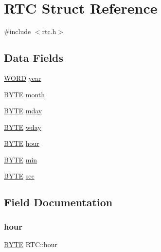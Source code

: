 \hypertarget{struct_r_t_c}{}\section{R\+TC Struct Reference}
\label{struct_r_t_c}


{\ttfamily \#include $<$rtc.\+h$>$}

\subsection*{Data Fields}
\begin{DoxyCompactItemize}
\item 
\mbox{\hyperlink{integer_8h_a197942eefa7db30960ae396d68339b97}{W\+O\+RD}} \mbox{\hyperlink{struct_r_t_c_acb5071073b17bef18e2e0c0cf10900e1}{year}}
\item 
\mbox{\hyperlink{lz4_8c_a4ae1dab0fb4b072a66584546209e7d58}{B\+Y\+TE}} \mbox{\hyperlink{struct_r_t_c_ac2bd3ef00f0fa3600b729702d3a4df96}{month}}
\item 
\mbox{\hyperlink{lz4_8c_a4ae1dab0fb4b072a66584546209e7d58}{B\+Y\+TE}} \mbox{\hyperlink{struct_r_t_c_acc4fbd65d30d36768b338a734a1f90a7}{mday}}
\item 
\mbox{\hyperlink{lz4_8c_a4ae1dab0fb4b072a66584546209e7d58}{B\+Y\+TE}} \mbox{\hyperlink{struct_r_t_c_ae5f840070c223cdc4c1d5279934bae1a}{wday}}
\item 
\mbox{\hyperlink{lz4_8c_a4ae1dab0fb4b072a66584546209e7d58}{B\+Y\+TE}} \mbox{\hyperlink{struct_r_t_c_a8116dd5108afa42843c41510b68dcab6}{hour}}
\item 
\mbox{\hyperlink{lz4_8c_a4ae1dab0fb4b072a66584546209e7d58}{B\+Y\+TE}} \mbox{\hyperlink{struct_r_t_c_a6a57a49351a0cdb606bb74d2930496ec}{min}}
\item 
\mbox{\hyperlink{lz4_8c_a4ae1dab0fb4b072a66584546209e7d58}{B\+Y\+TE}} \mbox{\hyperlink{struct_r_t_c_a4e9dca93b2215d13696ea8c92755c05a}{sec}}
\end{DoxyCompactItemize}


\subsection{Field Documentation}
\mbox{\label{struct_r_t_c_a8116dd5108afa42843c41510b68dcab6}} 
\subsubsection{\texorpdfstring{hour}{hour}}
{\footnotesize\ttfamily \mbox{\hyperlink{lz4_8c_a4ae1dab0fb4b072a66584546209e7d58}{B\+Y\+TE}} R\+T\+C\+::hour}

